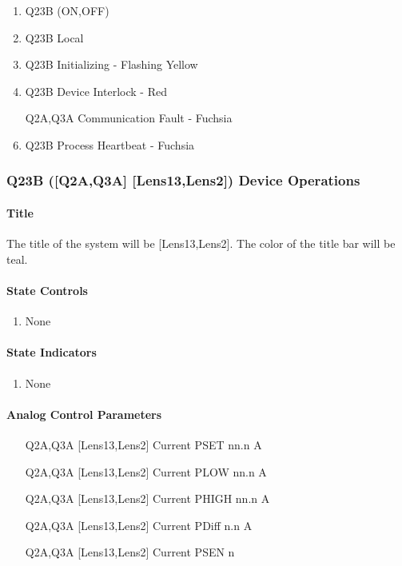 \documentclass[11pt]{book}		%
\begin{document}
\begin{enumerate}
 \item Q23B (ON,OFF)
 \item Q23B Local
 \item Q23B Initializing - Flashing Yellow
 \item Q23B Device Interlock - Red
 \item [Q2A,Q3A] Communication Fault - Fuchsia
 \item Q23B Process Heartbeat - Fuchsia
\end{enumerate}

\subsubsection{Q23B ([Q2A,Q3A] [Lens13,Lens2]) Device Operations} \label{sect:cyc-op-interface-ops-terminal-device-ops-q1}

\paragraph{Title} \label{sect:cyc-op-interface-ops-terminal-device-ops-q1-title}

The title of the system will be [Lens13,Lens2].  The color of the title bar will be teal.

\paragraph{State Controls}

\begin{enumerate}
\item None
\end{enumerate}

\paragraph{State Indicators}

\begin{enumerate}
 \item None
\end{enumerate}

\paragraph{Analog Control Parameters}

\begin{enumerate}
 \item [Q2A,Q3A] [Lens13,Lens2] Current PSET   nn.n A
 \item [Q2A,Q3A] [Lens13,Lens2] Current PLOW   nn.n A
 \item [Q2A,Q3A] [Lens13,Lens2] Current PHIGH  nn.n A
 \item [Q2A,Q3A] [Lens13,Lens2] Current PDiff n.n A
 \item [Q2A,Q3A] [Lens13,Lens2] Current PSEN  n
\end{enumerate}
\end{document}
